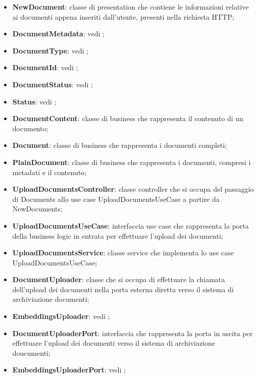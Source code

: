 \documentclass[10pt, a4paper]{article}
\begin{document}
\begin{itemize}
    \item \label{NewDocument}\textbf{NewDocument}: classe di presentation che contiene le informazioni relative ai documenti appena inseriti dall'utente, presenti nella richiesta HTTP;
    \item \textbf{DocumentMetadata}: vedi ;
    \item \textbf{DocumentType}: vedi ;
    \item \textbf{DocumentId}: vedi ;
    \item \textbf{DocumentStatus}: vedi ;
    \item \textbf{Status}: vedi ;
    \item \label{DocumentContent}\textbf{DocumentContent}: classe di business che rappresenta il contenuto di un documento;
    \item \label{Document}\textbf{Document}: classe di business che rappresenta i documenti completi;
    \item \label{PlainDocument}\textbf{PlainDocument}: classe di business che rappresenta i documenti, compresi i metadati e il contenuto;
    \item \label{UploadDocumentsController}\textbf{UploadDocumentsController}: classe controller che si occupa del passaggio di Documents allo use case UploadDocumentsUseCase a partire da NewDocuments;
    \item \label{UploadDocumentsUseCase}\textbf{UploadDocumentsUseCase}: interfaccia use case che rappresenta la porta della business logic in entrata per effettuare l'upload dei documenti;
    \item \label{UploadDocumentsService}\textbf{UploadDocumentsService}: classe service che implementa lo use case UploadDocumentsUseCase;
    \item \label{DocumentUploader}\textbf{DocumentUploader}: classe che si occupa di effettuare la chiamata dell'upload dei documenti nella porta esterna diretta verso il sistema di archiviazione documenti;
    \item \textbf{EmbeddingsUploader}: vedi ;
    \item \label{DocumentUploaderPort}\textbf{DocumentUploaderPort}: interfaccia che rappresenta la porta in uscita per effettuare l'upload dei documenti verso il sistema di archiviazione doucumenti;
    \item \textbf{EmbeddingsUploaderPort}: vedi ;

\end{itemize}
\end{document}

